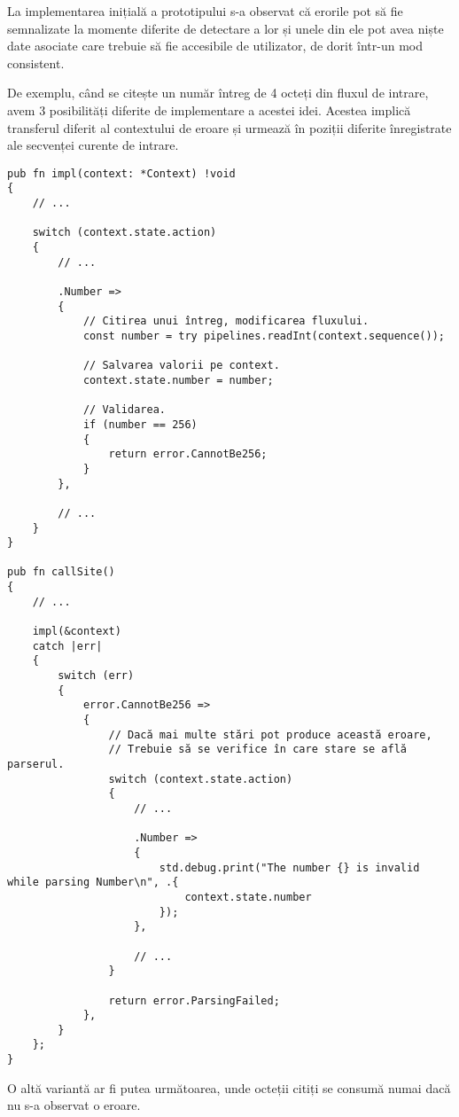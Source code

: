 \documentclass[a4paper,12pt]{report}
\begin{document}
La implementarea inițială a prototipului s-a observat că erorile pot să fie semnalizate
la momente diferite de detectare a lor și unele din ele pot avea niște date asociate
care trebuie să fie accesibile de utilizator, de dorit într-un mod consistent.

De exemplu, când se citește un număr întreg de 4 octeți din fluxul de intrare,
avem 3 posibilități diferite de implementare a acestei idei.
Acestea implică transferul diferit al contextului de eroare și
urmează în poziții diferite înregistrate ale secvenței curente de intrare.

\begin{verbatim}
pub fn impl(context: *Context) !void
{
    // ...

    switch (context.state.action)
    {
        // ...

        .Number =>
        {
            // Citirea unui întreg, modificarea fluxului.
            const number = try pipelines.readInt(context.sequence());

            // Salvarea valorii pe context.
            context.state.number = number;

            // Validarea.
            if (number == 256)
            {
                return error.CannotBe256;
            }
        },

        // ...
    }
}

pub fn callSite()
{
    // ...

    impl(&context)
    catch |err|
    {
        switch (err)
        {
            error.CannotBe256 =>
            {
                // Dacă mai multe stări pot produce această eroare,
                // Trebuie să se verifice în care stare se află parserul.
                switch (context.state.action)
                {
                    // ...

                    .Number =>
                    {
                        std.debug.print("The number {} is invalid while parsing Number\n", .{
                            context.state.number
                        });
                    },

                    // ...
                }

                return error.ParsingFailed;
            },
        }
    };
}
\end{verbatim}

O altă variantă ar fi putea următoarea, unde octeții citiți
se consumă numai dacă nu s-a observat o eroare.
\end{document}

